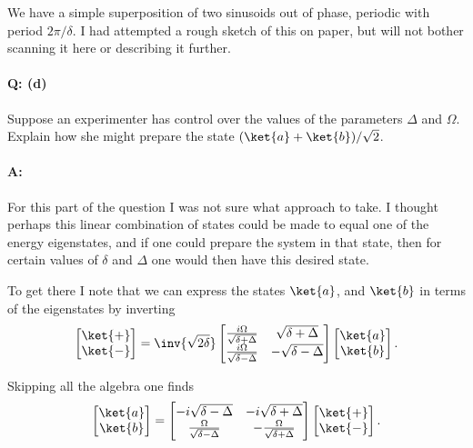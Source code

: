 {We have a simple superposition of two sinusoids out of phase, periodic with period \(2 \pi/\delta\).  I had attempted a rough sketch of this on paper, but will not bother scanning it here or describing it further.

\paragraph{Q: (d)}

Suppose an experimenter has control over the values of the parameters \(\Delta\) and \(\Omega\).  Explain how she might prepare the state \((\ket{a} + \ket{b})/\sqrt{2}\).

\paragraph{A:}

For this part of the question I was not sure what approach to take.  I thought perhaps this linear combination of states could be made to equal one of the energy eigenstates, and if one could prepare the system in that state, then for certain values of \(\delta\) and \(\Delta\) one would then have this desired state.

To get there I note that we can express the states \(\ket{a}\), and \(\ket{b}\) in terms of the eigenstates by inverting
%
\begin{equation}\label{eqn:qmIexamPractice2008Dec:2:150}
\begin{bmatrix}
\ket{+} \\
\ket{-} \\
\end{bmatrix}
=\inv{\sqrt{2\delta}}
\begin{bmatrix}
\frac{i \Omega}{\sqrt{\delta + \Delta}} & \sqrt{\delta + \Delta} \\
\frac{i \Omega}{\sqrt{\delta - \Delta}} & -\sqrt{\delta - \Delta}
\end{bmatrix}
\begin{bmatrix}
\ket{a} \\
\ket{b} \\
\end{bmatrix}.
\end{equation}

Skipping all the algebra one finds
%
\begin{equation}\label{eqn:qmIexamPractice2008Dec:2:160}
\begin{bmatrix}
\ket{a} \\
\ket{b} \\
\end{bmatrix}
=
\begin{bmatrix}
-i\sqrt{\delta - \Delta} & -i\sqrt{\delta + \Delta} \\
\frac{\Omega}{\sqrt{\delta - \Delta}} &
-\frac{\Omega}{\sqrt{\delta + \Delta}}
\end{bmatrix}
\begin{bmatrix}
\ket{+} \\
\ket{-} \\
\end{bmatrix}.
\end{equation}

}
